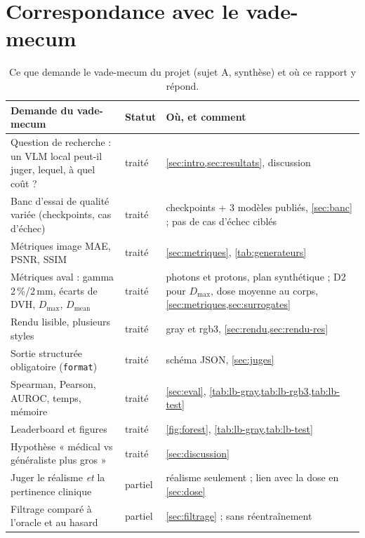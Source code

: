 \documentclass[11pt,a4paper]{article}
\begin{document}



\appendix
\section{Correspondance avec le vade-mecum}
\label{app:vademecum}

\begin{table}[H]
\centering\footnotesize
\caption{Ce que demande le vade-mecum du projet (sujet A, synthèse) et où ce rapport y répond.}
\begin{tabular}{>{\raggedright\arraybackslash}p{5.6cm}>{\raggedright\arraybackslash}p{1.5cm}>{\raggedright\arraybackslash}p{7.7cm}}
\toprule
Demande du vade-mecum & Statut & Où, et comment \\
\midrule
Question de recherche : un VLM local peut-il juger, lequel, à quel coût ? & traité & \cref{sec:intro,sec:resultats}, discussion \\
Banc d'essai de qualité variée (checkpoints, cas d'échec) & traité & 7 checkpoints + 3 modèles publiés, \cref{sec:banc} ; pas de cas d'échec ciblés \\
Métriques image MAE, PSNR, SSIM & traité & \cref{sec:metriques}, \cref{tab:generateurs} \\
Métriques aval : gamma 2\,\%/2\,mm, écarts de DVH, $D_\text{max}$, $D_\text{mean}$ & traité & photons et protons, plan synthétique ; D2 pour $D_\text{max}$, dose moyenne au corps, \cref{sec:metriques,sec:surrogates} \\
Rendu lisible, plusieurs styles & traité & gray et rgb3, \cref{sec:rendu,sec:rendu-res} \\
Sortie structurée obligatoire (\texttt{format}) & traité & schéma JSON, \cref{sec:juges} \\
Spearman, Pearson, AUROC, temps, mémoire & traité & \cref{sec:eval}, \cref{tab:lb-gray,tab:lb-rgb3,tab:lb-test} \\
Leaderboard et figures & traité & \cref{fig:forest}, \cref{tab:lb-gray,tab:lb-test} \\
Hypothèse « médical vs généraliste plus gros » & traité & \cref{sec:discussion} \\
Juger le réalisme \emph{et} la pertinence clinique & partiel & réalisme seulement ; lien avec la dose en \cref{sec:dose} \\
Filtrage comparé à l'oracle et au hasard & partiel & \cref{sec:filtrage} ; sans réentraînement \\

\end{tabular}
\end{table}
\end{document}

